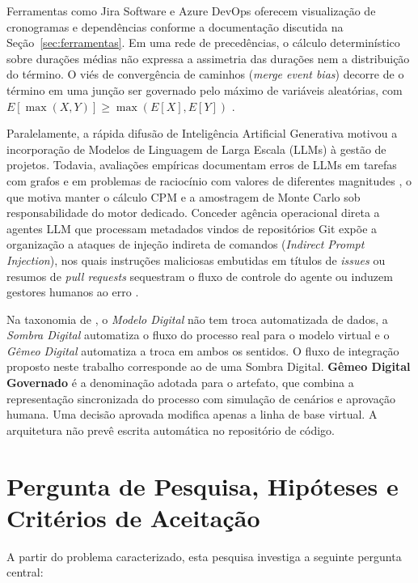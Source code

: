 \documentclass[12pt,openany,oneside,a4paper,english,brazilian,sumario=tradicional]{abntex2}
\begin{document}
Ferramentas como Jira Software e Azure DevOps oferecem visualização de cronogramas e dependências conforme a documentação discutida na Seção~\ref{sec:ferramentas}. Em uma rede de precedências, o cálculo determinístico sobre durações médias não expressa a assimetria das durações nem a distribuição do término. O viés de convergência de caminhos (\textit{merge event bias}) decorre de o término em uma junção ser governado pelo máximo de variáveis aleatórias, com $E[\max(X,Y)] \ge \max(E[X],E[Y])$ \cite{vanslyke1963,maccrimmon1964}.

Paralelamente, a rápida difusão de Inteligência Artificial Generativa motivou a incorporação de Modelos de Linguagem de Larga Escala (LLMs) à gestão de projetos. Todavia, avaliações empíricas documentam erros de LLMs em tarefas com grafos e em problemas de raciocínio com valores de diferentes magnitudes \cite{tang2024grapharena,richardeau2024graphs,shrestha2025gsmranges}, o que motiva manter o cálculo CPM e a amostragem de Monte Carlo sob responsabilidade do motor dedicado. Conceder agência operacional direta a agentes LLM que processam metadados vindos de repositórios Git expõe a organização a ataques de injeção indireta de comandos (\textit{Indirect Prompt Injection}), nos quais instruções maliciosas embutidas em títulos de \textit{issues} ou resumos de \textit{pull requests} sequestram o fluxo de controle do agente ou induzem gestores humanos ao erro \cite{greshake2023,owasp2023,owasp2025,debenedetti2024}.

Na taxonomia de , o \textit{Modelo Digital} não tem troca automatizada de dados, a \textit{Sombra Digital} automatiza o fluxo do processo real para o modelo virtual e o \textit{Gêmeo Digital} automatiza a troca em ambos os sentidos. O fluxo de integração proposto neste trabalho corresponde ao de uma Sombra Digital. \textbf{Gêmeo Digital Governado} é a denominação adotada para o artefato, que combina a representação sincronizada do processo \cite{guinea2024} com simulação de cenários e aprovação humana. Uma decisão aprovada modifica apenas a linha de base virtual. A arquitetura não prevê escrita automática no repositório de código.

\section{Pergunta de Pesquisa, Hipóteses e Critérios de Aceitação}

A partir do problema caracterizado, esta pesquisa investiga a seguinte pergunta central:
\end{document}
